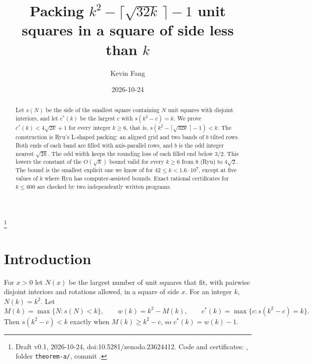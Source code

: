 \documentclass[11pt,letterpaper]{amsart}
\theoremstyle{plain}
\theoremstyle{remark}
\newcommand{\cs}{c^{*}}
\begin{document}
\title[Packing $k^2-\lceil\sqrt{32k}\,\rceil-1$ unit squares below side $k$]{Packing $k^2-\lceil\sqrt{32k}\,\rceil-1$ unit squares in a square of side less than $k$}
\author{Kevin Fang}
\date{2026-10-24}
\thanks{Draft v0.1, 2026-10-24, doi:10.5281/zenodo.23624412. Code and certificates: \cite{Fan26b}, folder \texttt{theorem-a/}, commit .}

\begin{abstract}
Let $s(N)$ be the side of the smallest square containing $N$ unit squares with disjoint interiors, and let $\cs(k)$ be the largest $c$ with $s(k^2-c)=k$. We prove $\cs(k)<4\sqrt{2k}+1$ for every integer $k\ge6$, that is, $s(k^2-\lceil\sqrt{32k}\,\rceil-1)<k$. The construction is Ryu's L-shaped packing: an aligned grid and two bands of $b$ tilted rows. Both ends of each band are filled with axis-parallel rows, and $b$ is the odd integer nearest $\sqrt{2k}$. The odd width keeps the rounding loss of each filled end below $3/2$. This lowers the constant of the $O(\sqrt k)$ bound valid for every $k\ge6$ from $8$ (Ryu) to $4\sqrt2$. The bound is the smallest explicit one we know of for $42\le k<1.6\cdot10^7$, except at five values of $k$ where Ryu has computer-assisted bounds. Exact rational certificates for $k\le600$ are checked by two independently written programs.
\end{abstract}

\maketitle

\section{Introduction}

For $x>0$ let $N(x)$ be the largest number of unit squares that fit, with pairwise disjoint interiors and rotations allowed, in a square of side $x$. For an integer $k$, $N(k)=k^2$. Let
\[
M(k)=\max\{N : s(N)<k\},\qquad w(k)=k^2-M(k),\qquad \cs(k)=\max\{c : s(k^2-c)=k\}.
\]
Then $s(k^2-c)<k$ exactly when $M(k)\ge k^2-c$, so $\cs(k)=w(k)-1$.
\end{document}
